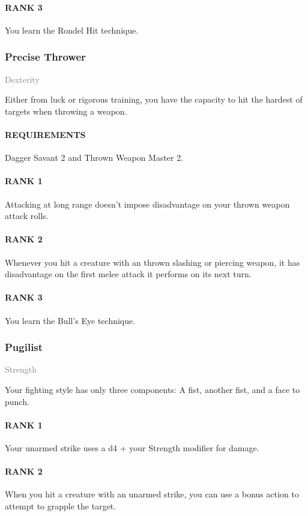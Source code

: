 \paragraph{RANK 3} You learn the Rondel Hit technique.

\subsubsection{Precise Thrower} \label{feat::precisethrower}
\small{\textcolor{gray}{Dexterity}}

\normalsize
Either from luck or rigorous training, you have the capacity to hit the hardest of targets when throwing a weapon.
\paragraph{REQUIREMENTS} Dagger Savant 2 and Thrown Weapon Master 2.
\paragraph{RANK 1} Attacking at long range doesn't impose disadvantage on your thrown weapon attack rolls.
\paragraph{RANK 2} Whenever you hit a creature with an thrown slashing or piercing weapon, it has disadvantage on the first melee attack it performs on its next turn.
\paragraph{RANK 3} You learn the Bull's Eye technique.

\subsubsection{Pugilist} \label{feat::pugilist}
\small{\textcolor{gray}{Strength}}

\normalsize
Your fighting style has only three components:
A fist, another fist, and a face to punch.
\paragraph{RANK 1} Your unarmed strike uses a d4 + your Strength modifier for damage.
\paragraph{RANK 2} When you hit a creature with an unarmed strike, you can use a bonus action to attempt to grapple the target.
